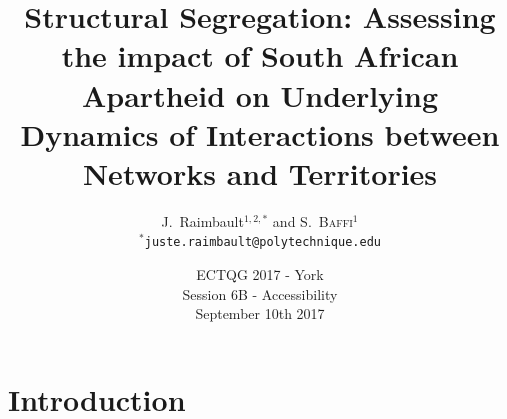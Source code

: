\documentclass[english,11pt]{beamer}
\newcommand{\noun}[1]{\textsc{#1}}
\begin{document}
\title{Structural Segregation: Assessing the impact of South African Apartheid on Underlying Dynamics of Interactions between Networks and Territories}

\author{J.~Raimbault$^{1,2,\ast}$ and \noun{S.~Baffi}$^{1}$\\
$^{\ast}$\texttt{juste.raimbault@polytechnique.edu}
}




\date{ECTQG 2017 - York\\\smallskip
Session 6B  - Accessibility\\\smallskip
September 10th 2017
}

\frame{\maketitle}









\section{Introduction}
\end{document}
